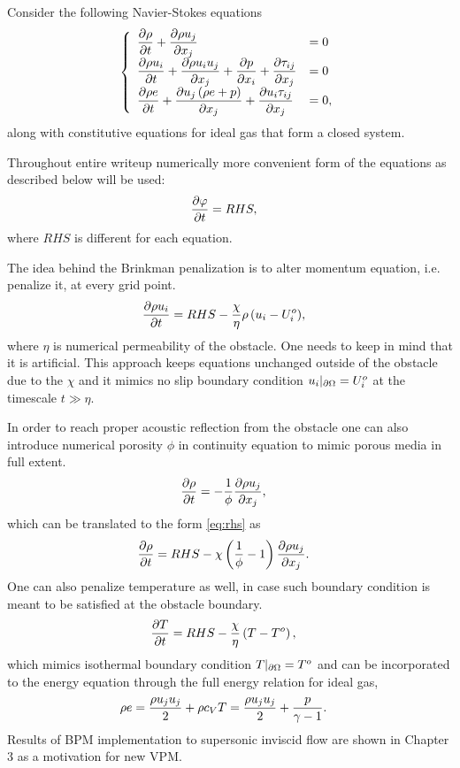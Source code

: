 Consider the following Navier-Stokes equations
\begin{align}
\left\{\begin{array}{ll}
\displaystyle \frac {\partial \rho}{\partial t} + \frac {\partial \rho u_j}{\partial x_j} &= 0 \\
\displaystyle \frac {\partial \rho u_i}{\partial t} + \frac {\partial \rho u_i u_j}{\partial x_j} + \frac {\partial p}{\partial x_i} + \frac {\partial \tau_{ij}}{\partial x_j} &= 0\\
\displaystyle \frac {\partial \rho e}{\partial t} + \frac {\partial u_j \left(\rho e + p\right)}{\partial x_j} + \frac {\partial u_i \tau_{ij}}{\partial x_j} &= 0,
\end{array}\right.
\end{align}
along with constitutive equations for ideal gas that form a closed system.

Throughout entire writeup numerically more convenient form of the equations as described below will be used:
\begin{align}
\frac {\partial \varphi}{\partial t} &= RHS, \label{eq:rhs}
\end{align}
where $RHS$ is different for each equation.

The idea behind the Brinkman penalization is to alter momentum equation, i.e. penalize it, at every grid point. 
\begin{align}
\frac {\partial \rho u_i}{\partial t} &= RHS - \frac \chi \eta {\rho \left(u_i - U_i^o\right)},
\end{align}
where $\eta$ is numerical permeability of the obstacle. One needs to keep in mind that it is artificial. This approach keeps equations unchanged outside of the obstacle due to the $\chi$ and it mimics no slip boundary condition $u_i|_{\partial \Omega} = U_i^o$ at the timescale $t \gg \eta$. 

In order to reach proper acoustic reflection from the obstacle one can also introduce numerical porosity $\phi$ in continuity equation to mimic porous media in full extent.
\begin{align}
\nonumber
\frac {\partial \rho}{\partial t} &= -\frac 1\phi \frac {\partial \rho u_j}{\partial x_j},
\end{align}
which can be translated to the form \eqref{eq:rhs} as 
\begin{align}
\frac {\partial \rho}{\partial t} &= RHS - \chi \left(\frac 1\phi - 1\right) \frac {\partial \rho u_j}{\partial x_j}. \label{eq:poro_den}
\end{align}
One can also penalize temperature as well, in case such boundary condition is meant to be satisfied at the obstacle boundary.
\begin{align}
\frac {\partial T}{\partial t} &= RHS - \frac \chi \eta \left(T - T^o\right),
\end{align}
which mimics isothermal boundary condition $T|_{\partial \Omega} = T^o$ and can be incorporated to the energy equation through the full energy relation for ideal gas,
\begin{align}
\rho e &= \frac {\rho u_j u_j}2 + \rho c_VT = \frac {\rho u_j u_j}2 + \frac p{\gamma - 1} \label{eq:igeos}.
\end{align}
Results of BPM implementation to supersonic inviscid flow are shown in Chapter 3 as a motivation for new VPM.

